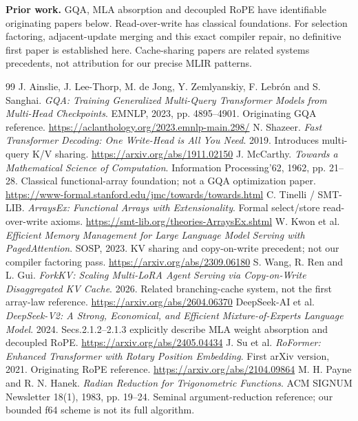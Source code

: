 \documentclass[10pt,a4paper]{article}
\newcommand{\smallnote}[1]{{\footnotesize #1\par}}
\begin{document}
\clearpage
\renewcommand{\refname}{References and attribution}
\smallnote{\textbf{Prior work.} GQA, MLA absorption and decoupled RoPE have identifiable originating papers below. Read-over-write has classical foundations. For selection factoring, adjacent-update merging and this exact compiler repair, no definitive first paper is established here. Cache-sharing papers are related systems precedents, not attribution for our precise MLIR patterns.}
\vspace{3pt}
\begingroup
\small
\setlength{\parskip}{1pt}
\begin{thebibliography}{99}
\setlength{\itemsep}{3pt}
 J. Ainslie, J. Lee-Thorp, M. de Jong, Y. Zemlyanskiy, F. Lebr\'on and S. Sanghai.
\emph{GQA: Training Generalized Multi-Query Transformer Models from Multi-Head Checkpoints}. EMNLP, 2023, pp. 4895--4901. Originating GQA reference.
\url{https://aclanthology.org/2023.emnlp-main.298/}
 N. Shazeer. \emph{Fast Transformer Decoding: One Write-Head is All You Need}. 2019. Introduces multi-query K/V sharing.
\url{https://arxiv.org/abs/1911.02150}
 J. McCarthy. \emph{Towards a Mathematical Science of Computation}. Information Processing'62, 1962, pp. 21--28. Classical functional-array foundation; not a GQA optimization paper.
\url{https://www-formal.stanford.edu/jmc/towards/towards.html}
 C. Tinelli / SMT-LIB. \emph{ArraysEx: Functional Arrays with Extensionality}. Formal select/store read-over-write axioms.
\url{https://smt-lib.org/theories-ArraysEx.shtml}
 W. Kwon et al. \emph{Efficient Memory Management for Large Language Model Serving with PagedAttention}. SOSP, 2023. KV sharing and copy-on-write precedent; not our compiler factoring pass.
\url{https://arxiv.org/abs/2309.06180}
 S. Wang, R. Ren and L. Gui. \emph{ForkKV: Scaling Multi-LoRA Agent Serving via Copy-on-Write Disaggregated KV Cache}. 2026. Related branching-cache system, not the first array-law reference.
\url{https://arxiv.org/abs/2604.06370}
 DeepSeek-AI et al. \emph{DeepSeek-V2: A Strong, Economical, and Efficient Mixture-of-Experts Language Model}. 2024. Secs.2.1.2--2.1.3 explicitly describe MLA weight absorption and decoupled RoPE.
\url{https://arxiv.org/abs/2405.04434}
 J. Su et al. \emph{RoFormer: Enhanced Transformer with Rotary Position Embedding}. First arXiv version, 2021. Originating RoPE reference.
\url{https://arxiv.org/abs/2104.09864}
 M. H. Payne and R. N. Hanek. \emph{Radian Reduction for Trigonometric Functions}. ACM SIGNUM Newsletter 18(1), 1983, pp. 19--24. Seminal argument-reduction reference; our bounded f64 scheme is not its full algorithm.

\end{thebibliography}
\end{document}

